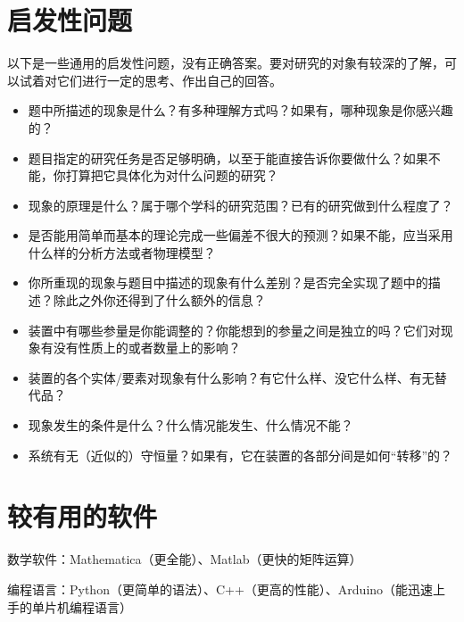 \documentclass[a4paper,10pt,english]{sphinxmanual}
\begin{document}
\section{启发性问题}
\label{\detokenize{7. Appendix:id30}}
以下是一些通用的启发性问题，没有正确答案。要对研究的对象有较深的了解，可以试着对它们进行一定的思考、作出自己的回答。
\begin{itemize}
\item {} 
题中所描述的现象是什么？有多种理解方式吗？如果有，哪种现象是你感兴趣的？

\item {} 
题目指定的研究任务是否足够明确，以至于能直接告诉你要做什么？如果不能，你打算把它具体化为对什么问题的研究？

\item {} 
现象的原理是什么？属于哪个学科的研究范围？已有的研究做到什么程度了？

\item {} 
是否能用简单而基本的理论完成一些偏差不很大的预测？如果不能，应当采用什么样的分析方法或者物理模型？

\item {} 
你所重现的现象与题目中描述的现象有什么差别？是否完全实现了题中的描述？除此之外你还得到了什么额外的信息？

\item {} 
装置中有哪些参量是你能调整的？你能想到的参量之间是独立的吗？它们对现象有没有性质上的或者数量上的影响？

\item {} 
装置的各个实体/要素对现象有什么影响？有它什么样、没它什么样、有无替代品？

\item {} 
现象发生的条件是什么？什么情况能发生、什么情况不能？

\item {} 
系统有无（近似的）守恒量？如果有，它在装置的各部分间是如何“转移”的？

\end{itemize}



\section{较有用的软件}
\label{\detokenize{7. Appendix:id31}}
数学软件：Mathematica（更全能）、Matlab（更快的矩阵运算）

编程语言：Python（更简单的语法）、C++（更高的性能）、Arduino（能迅速上手的单片机编程语言）
\end{document}
